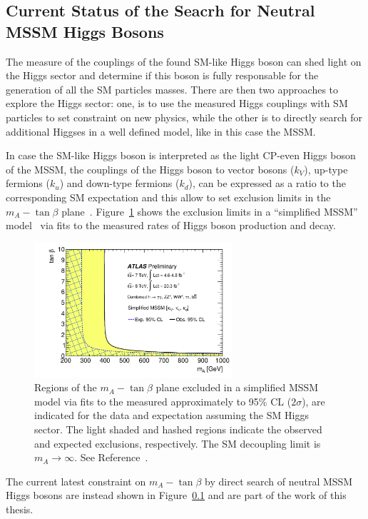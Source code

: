 \subsection{Current Status of the Seacrh for Neutral MSSM Higgs Bosons}

The measure of the couplings of the found SM-like Higgs boson can shed light on the Higgs sector and determine if this boson
is fully responsable for the generation of all the SM particles masses. 
There are then two approaches to explore the Higgs sector: one, is to use the measured Higgs couplings with SM particles to 
set constraint on new physics, while the other is to directly search for additional Higgses in a well defined model, like in this case the MSSM.

In case the SM-like Higgs boson is interpreted as the light CP-even Higgs boson of the MSSM, the couplings of the Higgs boson 
to vector bosons ($k_V$), up-type fermions ($k_u$) and down-type fermions ($k_d$), can be expressed as a ratio to the corresponding SM expectation
and this allow to set exclusion limits in the $m_A - \tan\beta$ plane~\cite{AtlasConstraint}. Figure~\ref{fig:ex1} shows the exclusion limits in a 
``simplified MSSM'' model~\cite{atlasCostraint11} via fits to the measured rates of Higgs boson production and decay.

 
\begin{figure}[tp]
     \begin{center}

            \includegraphics[height=5cm]{figure/limits/constraintAtlas.pdf}

    \end{center}
    \caption{Regions of the  $m_A - \tan\beta$ plane excluded in a simplified MSSM model via fits to the measured
approximately to 95\% CL ($2\sigma$), are indicated for the data and expectation assuming the SM Higgs sector.
The light shaded and hashed regions indicate the observed and expected exclusions, respectively. The
SM decoupling limit is $m_A \rightarrow \infty$. See Reference~\cite{AtlasConstraint}.}

   \label{fig:ex1}
\end{figure}


The current latest constraint on $m_A - \tan\beta$  by direct search of neutral MSSM Higgs bosons are instead shown in Figure~\ref{}
and are part of the work of this thesis.






















